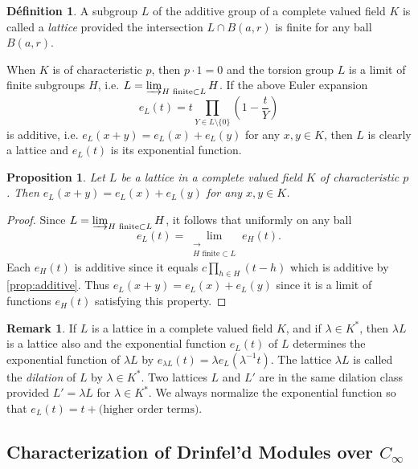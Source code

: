 \documentclass[12pt,a4paper]{article}
\theoremstyle{plain}
\newtheorem{proposition}{Proposition}[section]
\theoremstyle{definition}
\newtheorem{definition}{D\'efinition}[section]
\newtheorem{remark}{Remark}[section]
\theoremstyle{remark}
\begin{document}
\begin{definition}
\label{def:lattice}
A subgroup $L$ of the additive group of a complete valued field $K$ is called a \emph{lattice} provided the intersection $L \cap B(a, r)$ is finite for any ball $B(a, r)$.
\end{definition}

When $K$ is of characteristic $p$, then $p \cdot 1 = 0$ and the torsion group $L$ is a limit of finite subgroups $H$, i.e. $L = \varinjlim_{H \text{ finite} \subset L} H$. If the above Euler expansion
\[
e_L(t) = t \prod_{Y \in L \setminus \{0\}} \left(1 - \frac{t}{Y}\right)
\]
is additive, i.e. $e_L(x+y) = e_L(x) + e_L(y)$ for any $x, y \in K$, then $L$ is clearly a lattice and $e_L(t)$ is its exponential function.

\begin{proposition}
\label{prop:additive}
Let $L$ be a lattice in a complete valued field $K$ of characteristic $p$. Then $e_L(x+y) = e_L(x) + e_L(y)$ for any $x, y \in K$.
\end{proposition}

\begin{proof}
Since $L = \varinjlim_{H \text{ finite} \subset L} H$, it follows that uniformly on any ball
\[
e_L(t) = \lim_{\substack{\longrightarrow \\ H \text{ finite} \subset L}} e_H(t).
\]
Each $e_H(t)$ is additive since it equals $c \prod_{h \in H} (t - h)$ which is additive by \eqref{prop:additive}. Thus $e_L(x+y) = e_L(x) + e_L(y)$ since it is a limit of functions $e_H(t)$ satisfying this property.
\end{proof}

\begin{remark}
\label{rem:dilation}
If $L$ is a lattice in a complete valued field $K$, and if $\lambda \in K^*$, then $\lambda L$ is a lattice also and the exponential function $e_L(t)$ of $L$ determines the exponential function of $\lambda L$ by $e_{\lambda L}(t) = \lambda e_L(\lambda^{-1} t)$. The lattice $\lambda L$ is called the \emph{dilation} of $L$ by $\lambda \in K^*$. Two lattices $L$ and $L'$ are in the same dilation class provided $L' = \lambda L$ for $\lambda \in K^*$. We always normalize the exponential function so that $e_L(t) = t + \text{(higher order terms)}$.
\end{remark}

\subsection{Characterization of Drinfel'd Modules over $C_\infty$}
\label{sec:characterization}
\end{document}
